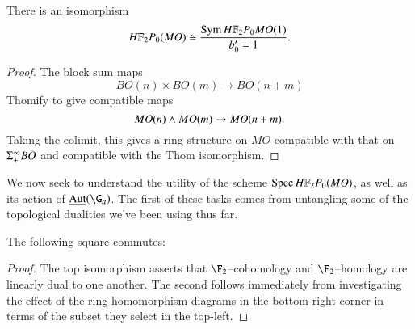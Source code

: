 \begin{corollary}\label{HF2MOisFree}
There is an isomorphism \[\HFtwo P_0(MO) \cong \frac{\Sym \HFtwo P_0 MO(1)}{b'_0 = 1}.\]
\end{corollary}
\begin{proof}
The block sum maps \[BO(n) \times BO(m) \to BO(n+m)\] Thomify to give compatible maps \[MO(n) \wedge MO(m) \to MO(n+m).\]  Taking the colimit, this gives a ring structure on $MO$ compatible with that on $\Sigma^\infty_+ BO$ and compatible with the Thom isomorphism.
\end{proof}

We now seek to understand the utility of the scheme $\Spec \HFtwo P_0(MO)$, as well as its action of $\InternalAut(\G_a)$.  The first of these tasks comes from untangling some of the topological dualities we've been using thus far.
\begin{lemma}\label{DetectingMORingMapsInHomotopy}
The following square commutes:
\begin{center}
\end{center}
\end{lemma}
\begin{proof}
The top isomorphism asserts that $\F_2$--cohomology and $\F_2$--homology are linearly dual to one another.  The second follows immediately from investigating the effect of the ring homomorphism diagrams in the bottom-right corner in terms of the subset they select in the top-left.
\end{proof}

